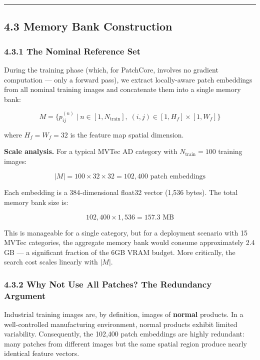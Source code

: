 \begin{center}\rule{0.5\linewidth}{0.5pt}\end{center}

\subsection{4.3 Memory Bank Construction}\label{memory-bank-construction}

\subsubsection{4.3.1 The Nominal Reference Set}\label{the-nominal-reference-set}

During the training phase (which, for PatchCore, involves no gradient computation --- only a forward pass), we extract locally-aware patch embeddings from all nominal training images and concatenate them into a single memory bank:

\[M = \{p_{ij}^{(n)} \mid n \in [1, N_{\text{train}}], \; (i,j) \in [1, H_f] \times [1, W_f]\}\]

where \(H_f = W_f = 32\) is the feature map spatial dimension.

\textbf{Scale analysis.} For a typical MVTec AD category with \(N_{\text{train}} = 100\) training images:

\[|M| = 100 \times 32 \times 32 = 102{,}400 \text{ patch embeddings}\]

Each embedding is a 384-dimensional float32 vector (1,536 bytes). The total memory bank size is:

\[102{,}400 \times 1{,}536 = 157.3 \text{ MB}\]

This is manageable for a single category, but for a deployment scenario with 15 MVTec categories, the aggregate memory bank would consume approximately 2.4 GB --- a significant fraction of the 6GB VRAM budget. More critically, the search cost scales linearly with \(|M|\).

\subsubsection{4.3.2 Why Not Use All Patches? The Redundancy Argument}\label{why-not-use-all-patches-the-redundancy-argument}

Industrial training images are, by definition, images of \textbf{normal} products. In a well-controlled manufacturing environment, normal products exhibit limited variability. Consequently, the 102,400 patch embeddings are highly redundant: many patches from different images but the same spatial region produce nearly identical feature vectors.

